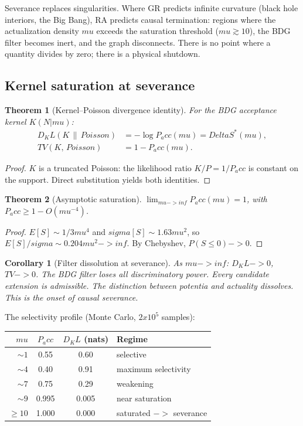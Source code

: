 \documentclass[11pt]{article}
\def\Delta{Delta}%
\def\sigma{sigma}%
\def\mu{mu}%
\def\mathrm#1{#1}%
\def\mathbf#1{#1}%
\def\mathbb#1{#1}%
\def\frac#1#2{#1/#2}%
\def\times{x}%
\def\to{->}%
\def\infty{inf}%
\def\Pacc{P_acc}%
\def\Dkl{D_KL}%
\def\TV{TV}%
\newtheorem{theorem}{Theorem}
\newtheorem{corollary}{Corollary}
\newcommand{\Pacc}{P_{\mathrm{acc}}}
\newcommand{\Dkl}{D_{\mathrm{KL}}}
\newcommand{\TV}{\mathrm{TV}}
\begin{document}
Severance replaces singularities. Where GR predicts infinite curvature (black hole interiors, the Big Bang), RA predicts causal termination: regions where the actualization density $\mu$ exceeds the saturation threshold ($\mu\gtrsim 10$), the BDG filter becomes inert, and the graph disconnects. There is no point where a quantity divides by zero; there is a physical shutdown.

\subsection{Kernel saturation at severance}

\begin{theorem}[Kernel--Poisson divergence identity]
\label{thm:kl}
For the BDG acceptance kernel $K(\mathbf{N}|\mu)$:
\begin{align}
\Dkl(K\,\|\,\mathrm{Poisson}) &= -\log\Pacc(\mu) = \Delta S^*(\mu), \\
\TV(K,\,\mathrm{Poisson}) &= 1-\Pacc(\mu).
\end{align}
\end{theorem}
\begin{proof}
$K$ is a truncated Poisson: the likelihood ratio $K/P=1/\Pacc$ is constant on the support. Direct substitution yields both identities.
\end{proof}

\begin{theorem}[Asymptotic saturation]
\label{thm:saturation}
$\lim_{\mu\to\infty}\Pacc(\mu)=1$, with $\Pacc\ge 1-O(\mu^{-4})$.
\end{theorem}
\begin{proof}
$\mathbb{E}[S]\sim\frac{1}{3}\mu^4$ and $\sigma[S]\sim 1.63\mu^2$, so $\mathbb{E}[S]/\sigma\sim 0.204\mu^2\to\infty$. By Chebyshev, $\mathbb{P}(S\le 0)\to 0$.
\end{proof}

\begin{corollary}[Filter dissolution at severance]
As $\mu\to\infty$: $\Dkl\to 0$, $\TV\to 0$. The BDG filter loses all discriminatory power. Every candidate extension is admissible. The distinction between potentia and actuality dissolves. This is the onset of causal severance.
\end{corollary}

The selectivity profile (Monte Carlo, $2\times 10^5$ samples):

\begin{center}
\begin{tabular}{rccl}
\toprule
$\mu$ & $\Pacc$ & $\Dkl$ (nats) & Regime \\
\midrule
$\sim 1$ & 0.55 & 0.60 & selective \\
$\sim 4$ & 0.40 & 0.91 & maximum selectivity \\
$\sim 7$ & 0.75 & 0.29 & weakening \\
$\sim 9$ & 0.995 & 0.005 & near saturation \\
$\ge 10$ & 1.000 & 0.000 & saturated $\to$ severance \\
\bottomrule
\end{tabular}
\end{center}
\end{document}
